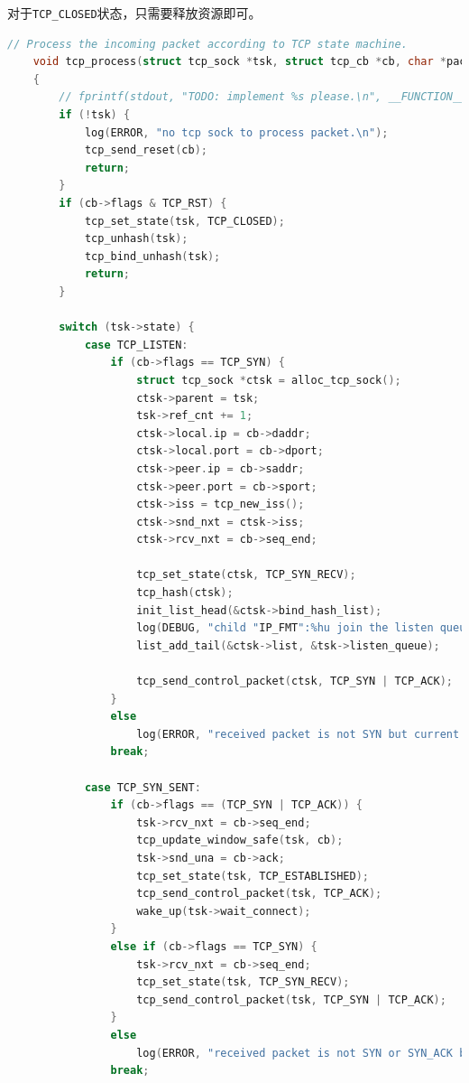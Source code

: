\documentclass[UTF8]{report}
\begin{document}
对于\texttt{TCP_CLOSED}状态，只需要释放资源即可。

\begin{lstlisting}[language=C]
    // Process the incoming packet according to TCP state machine. 
    void tcp_process(struct tcp_sock *tsk, struct tcp_cb *cb, char *packet)
    {
        // fprintf(stdout, "TODO: implement %s please.\n", __FUNCTION__);
        if (!tsk) {
            log(ERROR, "no tcp sock to process packet.\n");
            tcp_send_reset(cb);
            return;
        }
        if (cb->flags & TCP_RST) {
            tcp_set_state(tsk, TCP_CLOSED);
            tcp_unhash(tsk);
            tcp_bind_unhash(tsk);
            return;
        }
    
        switch (tsk->state) {
            case TCP_LISTEN:
                if (cb->flags == TCP_SYN) {
                    struct tcp_sock *ctsk = alloc_tcp_sock();
                    ctsk->parent = tsk;
                    tsk->ref_cnt += 1;
                    ctsk->local.ip = cb->daddr;
                    ctsk->local.port = cb->dport;
                    ctsk->peer.ip = cb->saddr;
                    ctsk->peer.port = cb->sport;
                    ctsk->iss = tcp_new_iss();
                    ctsk->snd_nxt = ctsk->iss;
                    ctsk->rcv_nxt = cb->seq_end;
    
                    tcp_set_state(ctsk, TCP_SYN_RECV);
                    tcp_hash(ctsk);
                    init_list_head(&ctsk->bind_hash_list);
                    log(DEBUG, "child "IP_FMT":%hu join the listen queue of parent "IP_FMT":%hu", HOST_IP_FMT_STR(ctsk->sk_sip), ntohs(ctsk->sk_sport), HOST_IP_FMT_STR(tsk->sk_sip), ntohs(tsk->sk_sport));
                    list_add_tail(&ctsk->list, &tsk->listen_queue);
    
                    tcp_send_control_packet(ctsk, TCP_SYN | TCP_ACK);
                }
                else
                    log(ERROR, "received packet is not SYN but current state is LISTEN, drop it.");
                break;
    
            case TCP_SYN_SENT:
                if (cb->flags == (TCP_SYN | TCP_ACK)) {
                    tsk->rcv_nxt = cb->seq_end;
                    tcp_update_window_safe(tsk, cb);
                    tsk->snd_una = cb->ack;
                    tcp_set_state(tsk, TCP_ESTABLISHED);
                    tcp_send_control_packet(tsk, TCP_ACK);
                    wake_up(tsk->wait_connect);
                }
                else if (cb->flags == TCP_SYN) {
                    tsk->rcv_nxt = cb->seq_end;
                    tcp_set_state(tsk, TCP_SYN_RECV);
                    tcp_send_control_packet(tsk, TCP_SYN | TCP_ACK);
                }
                else
                    log(ERROR, "received packet is not SYN or SYN_ACK but current state is SYN_SENT, drop it.");
                break;
    

\end{lstlisting}
\end{document}
